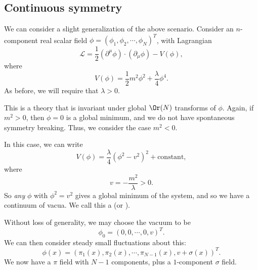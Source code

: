 \documentclass[a4paper]{article}
\begin{document}
\subsection{Continuous symmetry}
We can consider a slight generalization of the above scenario. Consider an $n$-component real scalar field $\phi = (\phi_1, \phi_2, \cdots, \phi_N)^T$, with Lagrangian
\[
  \mathcal{L} = \frac{1}{2} (\partial^\mu \phi) \cdot (\partial_\mu \phi) - V(\phi),
\]
where
\[
  V(\phi) = \frac{1}{2} m^2 \phi^2 + \frac{\lambda}{4} \phi^4.
\]
As before, we will require that $\lambda > 0$.

This is a theory that is invariant under global $\Or(N)$ transforms of $\phi$. Again, if $m^2 > 0$, then $\phi = 0$ is a global minimum, and we do not have spontaneous symmetry breaking. Thus, we consider the case $m^2 < 0$.

In this case, we can write
\[
  V(\phi) = \frac{\lambda}{4} (\phi^2 - v^2)^2 + \text{constant},
\]
where
\[
  v = -\frac{m^2}{\lambda} > 0.
\]
So \emph{any} $\phi$ with $\phi^2 = v^2$ gives a global minimum of the system, and so we have a continuum of vacua. We call this a  (or ).
\begin{center}
\end{center}
Without loss of generality, we may choose the vacuum to be
\[
  \phi_0 = (0, 0, \cdots, 0, v)^T.
\]
We can then consider steady small fluctuations about this:
\[
  \phi(x) = (\pi_1(x), \pi_2(x), \cdots, \pi_{N-1}(x), v + \sigma(x))^T.
\]
We now have a $\pi$ field with $N - 1$ components, plus a $1$-component $\sigma$ field.
\end{document}
